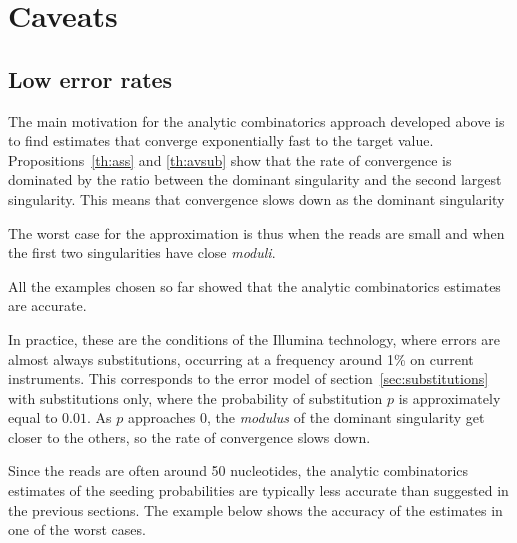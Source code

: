 \documentclass{article}
\begin{document}
\section{Caveats}

\subsection{Low error rates}
The main motivation for the analytic combinatorics approach developed
above is to find estimates that converge exponentially fast to the target
value. Propositions~\ref{th:ass} and \ref{th:avsub} show that the rate of
convergence is dominated by the ratio between the dominant singularity and
the second largest singularity. This means that convergence slows down as
the dominant singularity 

The worst case for the approximation is thus when the reads are
small and when the first two singularities have close \textit{moduli}.

All the examples chosen so far showed that the analytic combinatorics
estimates are accurate.

In practice, these are the conditions of the Illumina technology, where
errors are almost always substitutions, occurring at a frequency around
1\% on current instruments. This corresponds to the error model of
section~\ref{sec:substitutions} with substitutions only, where the
probability of substitution $p$ is approximately equal to $0.01$. As $p$
approaches $0$, the \textit{modulus} of the dominant singularity get
closer to the others, so the rate of convergence slows down.

Since the reads are often around 50 nucleotides, the analytic
combinatorics estimates of the seeding probabilities are typically less
accurate than suggested in the previous sections. The example below shows
the accuracy of the estimates in one of the worst cases.
\end{document}
